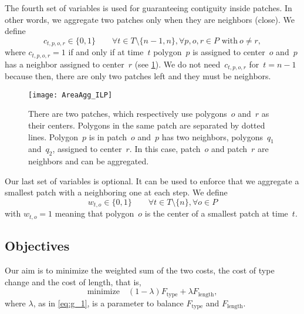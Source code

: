 The fourth set of variables is used for 
guaranteeing contiguity inside patches. 
In other words, we aggregate two patches 
only when they are neighbors (close).
We define 
$$
c_{t,p,o,r}\in \{0,1\} \qquad 
\forall t\in T\setminus \{n-1,n\}, 
\forall p,o,r \in P \text{~with}~o\ne r,
$$
where $c_{t,p,o,r}=1$ if and only if at time~$t$
polygon~$p$ is assigned to center~$o$ 
and~$p$ has a neighbor assigned to center~$r$
(see \fig\ref{fig:AreaAgg_Variables_Neighbor}).
We do not need~$c_{t,p,o,r}$ for~$t=n-1$ 
because then, there are only two patches left 
and they must be neighbors.

\begin{figure}[tb]
	\centering
	\texttt{[image: AreaAgg\_ILP]}
	\caption{There are two patches, 
		which respectively use polygons~$o$ and~$r$ 
		as their centers.
		Polygons in the same patch 
		are separated by dotted lines.
		Polygon~$p$ is in patch~$o$ and~$p$ has two neighbors,
		polygons~$q_1$ and~$q_2$, assigned to center~$r$.
		In this case, patch~$o$ and patch~$r$ are neighbors 
		and can be aggregated. 
	}
	\label{fig:AreaAgg_Variables_Neighbor}
\end{figure} 

Our last set of variables is optional.  It can be used to enforce that 
we aggregate a smallest patch with a neighboring one at each step. 
We define 
$$
w_{t,o}\in \{0,1\} \qquad 
\forall t\in T\setminus\{n\}, \forall o \in P 
$$
with $w_{t,o}=1$ meaning 
that polygon~$o$ is the center of 
a smallest patch at time~$t$.


\subsection{Objectives}
\label{sub:objectives}

Our aim is to minimize the weighted sum of the two costs, 
the cost of type change and the cost of length,
that is,
\begin{equation}
\label{eq:ilpcost}
\mathrm{minimize} \quad 
(1-\lambda)F_\mathrm{type} +\lambda F_\mathrm{length},
\nonumber
\end{equation}
where $\lambda$, as in \eq\ref{eq:g_1}, 
is a parameter to balance 
$F_\mathrm{type}$ and $F_\mathrm{length}$.

